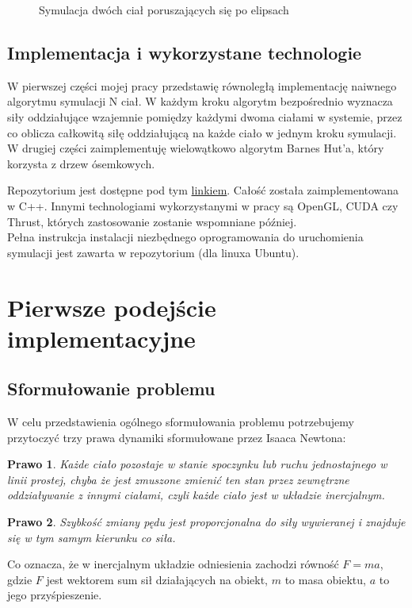 \documentclass[14pt,twoside,a4paper]{article}
\newtheorem{theorem}{Prawo}
\theoremstyle{definition}
\begin{document}
\begin{figure}
    \centering
    \def\svgwidth{\columnwidth}
    
    \caption{Symulacja dwóch ciał poruszających się po elipsach}
    \label{fig:kulki}
\end{figure}


\subsection{\Large Implementacja i wykorzystane technologie}
W pierwszej części mojej pracy przedstawię równoległą implementację naiwnego algorytmu symulacji N ciał. W każdym kroku algorytm bezpośrednio wyznacza siły oddziałujące wzajemnie pomiędzy każdymi dwoma ciałami w systemie, przez co oblicza całkowitą siłę oddziałującą na każde ciało w jednym kroku symulacji. W drugiej części zaimplementuję wielowątkowo algorytm Barnes Hut'a, który korzysta z drzew ósemkowych.

Repozytorium jest dostępne pod tym \href{https://github.com/damian1996/N-Body-Simulation}{linkiem}.
Całość została zaimplementowana w C++. Innymi technologiami wykorzystanymi w pracy są OpenGL, CUDA czy Thrust, których zastosowanie zostanie wspomniane później. \\
Pełna instrukcja instalacji niezbędnego oprogramowania do uruchomienia symulacji jest zawarta w repozytorium (dla linuxa Ubuntu).

\section{\LARGE Pierwsze podejście implementacyjne}
\bigskip

\subsection{\Large Sformułowanie problemu}
W celu przedstawienia ogólnego sformułowania problemu potrzebujemy przytoczyć trzy prawa dynamiki sformułowane przez Isaaca Newtona: \cite[str.~3-4]{fund}

\begin{theorem}
Każde ciało pozostaje w stanie spoczynku lub ruchu jednostajnego w linii prostej, chyba że jest zmuszone zmienić ten stan przez zewnętrzne oddziaływanie z innymi ciałami, czyli każde ciało jest w układzie inercjalnym.
\end{theorem}

\begin{theorem}
Szybkość zmiany pędu jest proporcjonalna do siły wywieranej i znajduje się w tym samym kierunku co siła.
\end{theorem}
Co oznacza, że w inercjalnym układzie odniesienia zachodzi równość $F=ma$, gdzie $F$ jest wektorem sum sił działających na obiekt, $m$ to masa obiektu, $a$ to jego przyśpieszenie.
\end{document}
